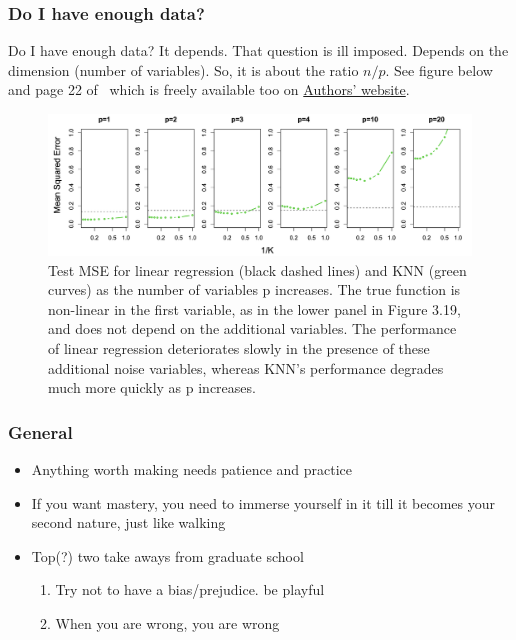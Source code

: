 \documentclass[serif, xcolor={dvipsnames}]{beamer} %
\newcommand\dangersign[1][2ex]{%
  \renewcommand\stacktype{L}%
  \scaleto{\stackon[1.3pt]{\color{red}$\triangle$}{\tiny !}}{#1}%
}
\newcommand{\Rq}{{\faSearch~}}
\begin{document}
\begin{frame}[t]
\frametitle{Do I have enough data?}
Do I have enough data? It depends. That question is ill imposed.
Depends on the dimension (number of variables). So, it is about
the ratio $n/p$. See figure below and page 22 of~\cite{hastie2017elements}
which is freely available too on \href{https://hastie.su.domains/ElemStatLearn/}{Authors' website}.

\begin{figure}[H]
\includegraphics[width=.8\linewidth]{enough_11}
\vspace{-.1in}
\caption{\scriptsize{Test MSE for linear regression (black dashed lines) and KNN
(green curves) as the number of variables p increases. The true function is non-linear 
in the first variable, as in the lower panel in Figure 3.19, and does not
depend on the additional variables. The performance of linear regression 
deteriorates slowly in the presence of these additional noise variables, whereas KNN's
performance degrades much more quickly as p increases.}}
\end{figure}

\end{frame}
\begin{frame}
\frametitle{General}

\begin{itemize}
\item Anything worth making needs patience and practice
\item If you want mastery, you need to immerse yourself in it till it becomes your second nature, just like walking

\vspace{.5in}
\item Top(?) two take aways from graduate school
\begin{enumerate}
\item Try not to have a bias/prejudice. be playful \Rq
\item When you are wrong, you are wrong \dangersign
\end{enumerate}
\end{itemize}
\end{frame}
\end{document}
